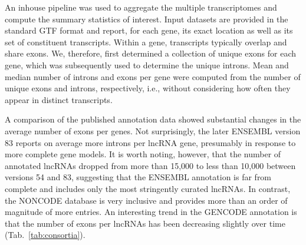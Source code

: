 \documentclass[ncrna,article,submit,moreauthors,pdftex,10pt,a4paper]{mdpi}
\begin{document}
An inhouse pipeline was used to aggregate the
multiple transcriptomes and compute the summary statistics of
interest. Input datasets are provided in the standard GTF format and
report, for each gene, its exact location as well as its set of constituent
transcripts. Within a gene, transcripts typically overlap and share exons.
We, therefore, first determined a collection of unique exons for each gene,
which was subsequently used to determine the unique introns. Mean and
median number of introns and exons per gene were computed from the number
of unique exons and introns, respectively, i.e., without considering how often
they appear in distinct transcripts.

A comparison of the published annotation data showed substantial changes in
the average number of exons per genes. Not surprisingly, the later ENSEMBL
version 83 reports on average more introns per lncRNA gene, presumably in
response to more complete gene models. It is worth noting, however, that
the number of annotated lncRNAs dropped from more than 15,000 to less than
10,000 between versions 54 and 83, suggesting that the ENSEMBL annotation
is far from complete and includes only the most stringently curated
lncRNAs. In contrast, the NONCODE database is very inclusive and provides
more than an order of magnitude of more entries. An interesting trend in the
GENCODE annotation is that the number of exons per lncRNAs has been
decreasing slightly over time (Tab.~\ref{tab:consortia}).

\vspace{6pt} 








\end{document}
